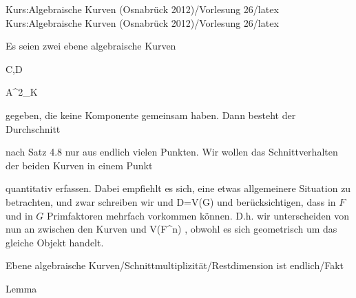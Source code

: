 Kurs:Algebraische Kurven (Osnabrück 2012)/Vorlesung 26/latex
Kurs:Algebraische Kurven (Osnabrück 2012)/Vorlesung 26/latex

\setcounter{section}{26}




Es seien zwei ebene algebraische Kurven


\mavergleichskette

{\vergleichskette

{C,D
}

{ \subset }{ {\mathbb A}^{2}_{K}
}

{  }{
}

{    }{
}

{   }{
}

}
{}{}{}
gegeben, die keine Komponente gemeinsam haben. Dann besteht der Durchschnitt

 nach
Satz 4.8
nur aus endlich vielen Punkten. Wir wollen das Schnittverhalten der beiden Kurven in einem Punkt

 quantitativ erfassen. Dabei empfiehlt es sich, eine etwas allgemeinere Situation zu betrachten, und zwar schreiben wir   {  und  }  { D=V(G)   }{ } und berücksichtigen, dass in $F$ und in $G$ Primfaktoren
 {} {}
mehrfach vorkommen können. D.h. wir unterscheiden von nun an zwischen den Kurven   {  und  }  { V(F^n)   }{ ,} obwohl es sich geometrisch um das gleiche Objekt handelt.



{Ebene algebraische Kurven/Schnittmultiplizität/Restdimension ist endlich/Fakt}

{Lemma}

{}

